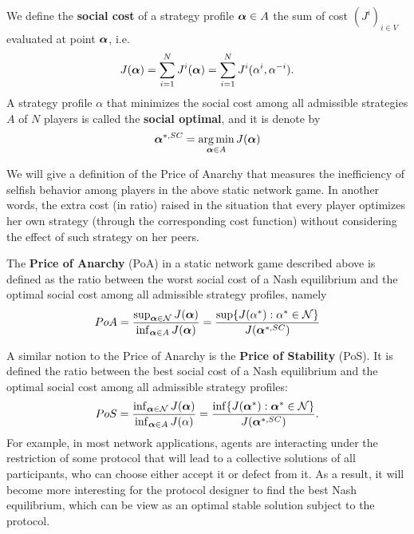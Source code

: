 \begin{definition}
	We define the \textbf{social cost} of a strategy profile $\boldsymbol{\alpha} \in A$ the sum of cost $(J^i)_{i\in V}$ evaluated at point $\boldsymbol{\alpha}$, i.e.
	\begin{equation}
	J(\boldsymbol{\alpha}) = \sum_{i=1}^N J^{i}(\boldsymbol{\alpha}) = \sum_{i=1}^N J^i(\alpha^i, \alpha^{-i}).
	\end{equation}
	A strategy profile $\alpha$ that minimizes the social cost among all admissible strategies $A$ of $N$ players is called the \textbf{social optimal}, and it is denote by 
	\begin{equation}
	\boldsymbol{\alpha}^{*,SC} =  \operatorname*{arg\,min}_{\boldsymbol{\alpha} \in A} J(\boldsymbol{\alpha})
	\end{equation}
\end{definition}

We will give a definition of the Price of Anarchy that measures the inefficiency of selfish behavior among players in the above static network game. In another words, the extra cost (in ratio) raised in the situation that every player optimizes her own strategy (through the corresponding cost function) without considering the effect of such strategy on her peers.
\begin{definition}
	The \textbf{Price of Anarchy} (PoA) in a static network game described above is defined as the ratio between the worst social cost of a Nash equilibrium and the optimal social cost among all admissible strategy profiles, namely
	\begin{equation}
	PoA = \frac{\sup_{\boldsymbol{\alpha} \in \mathcal{N}} J(\boldsymbol{\alpha})}{ \inf_{\boldsymbol{\alpha} \in A} J(\boldsymbol{\alpha})} = \frac{\sup \{ J(\alpha^*) : \alpha^* \in \mathcal{N} \} }{J(\boldsymbol{\alpha}^{*,SC}) }
	\end{equation}
\end{definition} 

A similar notion to the Price of Anarchy is the \textbf{Price of Stability} (PoS). It is defined the ratio between the best social cost of a Nash equilibrium and the optimal social cost among all admissible strategy profiles:
\begin{equation}
PoS = \frac{\inf_{\boldsymbol{\alpha} \in \mathcal{N}} J(\boldsymbol{\alpha}) }{ \inf_{\boldsymbol{\alpha} \in A} J(\alpha)} = \frac{\inf\{ J(\boldsymbol{\alpha}^*) : \boldsymbol{\alpha}^* \in \mathcal{N} \}}{J(\boldsymbol{\alpha}^{*,SC})}.
\end{equation}
For example, in most network applications, agents are interacting under the restriction of some protocol that will lead to a collective solutions of all participants, who can choose either accept it or defect from it. As a result, it will become more interesting for the protocol designer to find the best Nash equilibrium, which can be view as an optimal stable solution subject to the protocol. 

